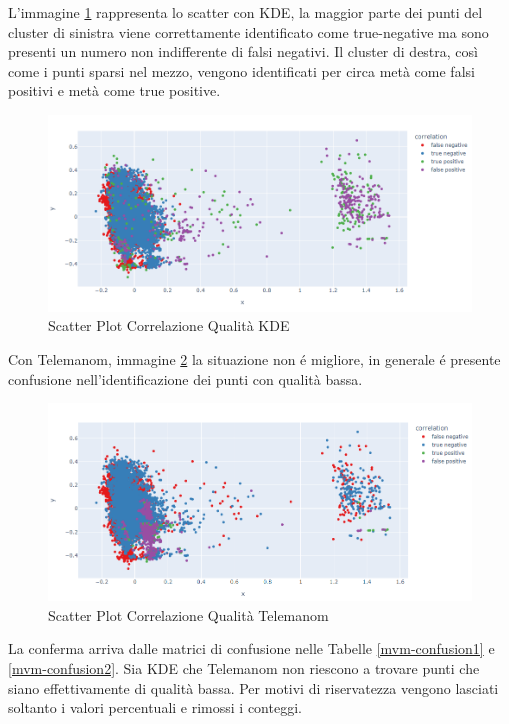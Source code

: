 L'immagine \ref{kde_quality} rappresenta lo scatter con KDE, la maggior parte dei punti del cluster di sinistra viene correttamente identificato come true-negative ma sono presenti un numero non indifferente di falsi negativi. Il cluster di destra, così come i punti sparsi nel mezzo, vengono identificati per circa metà come falsi positivi e metà come true positive.
\begin{figure}[t]
	\centering
	\includegraphics[width=14cm, scale=1]{images/correlation_ssb1_quality_plot.png}
	\caption{Scatter Plot Correlazione Qualità KDE}
	\label{kde_quality}
\end{figure}

Con Telemanom, immagine \ref{worst_clf_quality} la situazione non é migliore, in generale é presente confusione nell'identificazione dei punti con qualità bassa.


\begin{figure}[t]
	\centering
	\includegraphics[width=14cm, scale=1]{images/worst_correlation_ssb1_quality_plot}
	\caption{Scatter Plot Correlazione Qualità Telemanom}
	\label{worst_clf_quality}
\end{figure}

La conferma arriva dalle matrici di confusione nelle Tabelle \ref{mvm-confusion1} e \ref{mvm-confusion2}. Sia KDE che Telemanom non riescono a trovare punti che siano effettivamente di qualità bassa. Per motivi di riservatezza vengono lasciati soltanto i valori percentuali e rimossi i conteggi.



